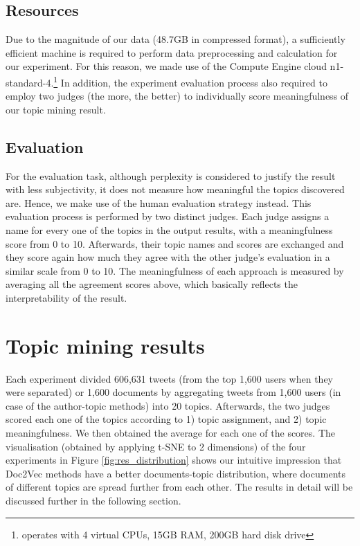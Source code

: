 \documentclass[11pt]{article}
\begin{document}
\subsection{Resources} \label{resources}

Due to the magnitude of our data (48.7GB in compressed format), a sufficiently efficient machine is required to perform data preprocessing and calculation for our experiment. For this reason, we made use of the Compute Engine cloud n1-standard-4.\footnote{operates with 4 virtual CPUs, 15GB RAM, 200GB hard disk drive} In addition, the experiment evaluation process also required to employ two judges (the more, the better) to individually score meaningfulness of our topic mining result.

\subsection{Evaluation}

For the evaluation task, although perplexity is considered to justify the result with less subjectivity, it does not measure how meaningful the topics discovered are. Hence, we make use of the human evaluation strategy\cite{zhao2011comparing} instead. This evaluation process is performed by two distinct judges. Each judge assigns a name for every one of the topics in the output results, with a meaningfulness score from 0 to 10. 
Afterwards, their topic names and scores are exchanged and they score again how much they agree with the other judge's evaluation in a similar scale from 0 to 10. The meaningfulness of each approach is measured by averaging all the agreement scores above, which basically reflects the interpretability of the result.

\section{Topic mining results}
Each experiment divided 606,631 tweets (from the top 1,600 users when they were separated) or 1,600 documents by aggregating tweets from 1,600 users (in case of the author-topic methods) into 20 topics. Afterwards, the two judges scored each one of the topics according to 1) topic assignment, and 2) topic meaningfulness. We then obtained the average for each one of the scores. The visualisation (obtained by applying t-SNE to 2 dimensions) of the four experiments in Figure \ref{fig:res_distribution} shows our intuitive impression that Doc2Vec methods have a better documents-topic distribution, where documents of different topics are spread further from each other. The results in detail will be discussed further in the following section.
\end{document}
